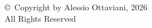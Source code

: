 \thispagestyle{empty}

\vspace*{\fill}

\begin{center}
\copyright\ Copyright by Alessio Ottaviani, 2026\\
All Rights Reserved
\end{center}

\vspace*{\fill}
